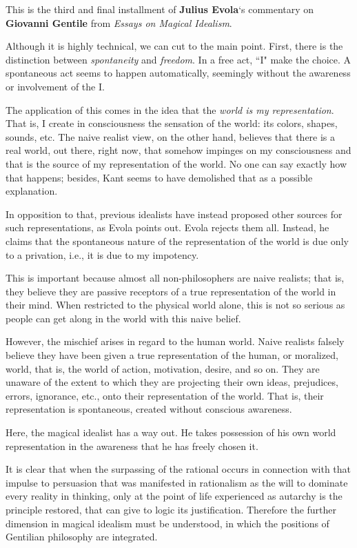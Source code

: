 \hfill

\begin{quotex}
This is the third and final installment of \textbf{Julius Evola}`s commentary on \textbf{Giovanni Gentile} from \emph{Essays on Magical Idealism}.

Although it is highly technical, we can cut to the main point. First, there is the distinction between \emph{spontaneity} and \emph{freedom}. In a free act, ``I" make the choice. A spontaneous act seems to happen automatically, seemingly without the awareness or involvement of the I.

The application of this comes in the idea that the \emph{world is my representation}. That is, I create in consciousness the sensation of the world: its colors, shapes, sounds, etc. The naive realist view, on the other hand, believes that there is a real world, out there, right now, that somehow impinges on my consciousness and that is the source of my representation of the world. No one can say exactly how that happens; besides, Kant seems to have demolished that as a possible explanation.

In opposition to that, previous idealists have instead proposed other sources for such representations, as Evola points out. Evola rejects them all. Instead, he claims that the spontaneous nature of the representation of the world is due only to a privation, i.e., it is due to my impotency.

This is important because almost all non-philosophers are naive realists; that is, they believe they are passive receptors of a true representation of the world in their mind. When restricted to the physical world alone, this is not so serious as people can get along in the world with this naive belief.

However, the mischief arises in regard to the human world. Naive realists falsely believe they have been given a true representation of the human, or moralized, world, that is, the world of action, motivation, desire, and so on. They are unaware of the extent to which they are projecting their own ideas, prejudices, errors, ignorance, etc., onto their representation of the world. That is, their representation is spontaneous, created without conscious awareness.

Here, the magical idealist has a way out. He takes possession of his own world representation in the awareness that he has freely chosen it. 

\end{quotex}
It is clear that when the surpassing of the rational occurs in connection with that impulse to persuasion that was manifested in rationalism as the will to dominate every reality in thinking, only at the point of life experienced as autarchy is the principle restored, that can give to logic its justification. Therefore the further dimension in magical idealism must be understood, in which the positions of Gentilian philosophy are integrated.

